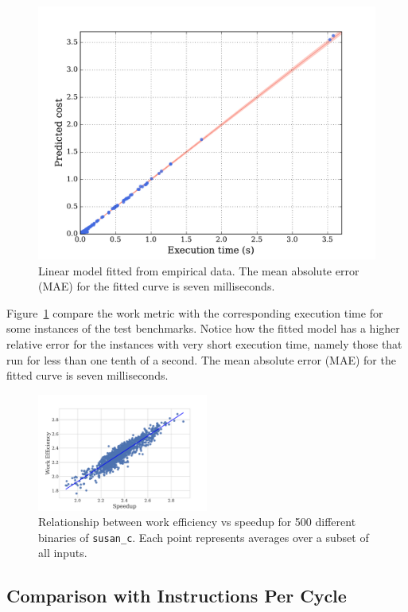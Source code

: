 \begin{figure}[t]
    \centering
    \includegraphics[width=0.6\linewidth]{figs/cost-model.pdf}
    \caption{Linear model fitted from empirical data. The mean absolute error (MAE) for the fitted curve is seven milliseconds.}
    \label{fig:cost-model}
\end{figure}

Figure~\ref{fig:cost-model} compare the work metric with the corresponding execution time for some instances of the test benchmarks.
Notice how the fitted model has a higher relative error for the instances with very short execution time, namely those that run for less than one tenth of a second.
The mean absolute error (MAE) for the fitted curve is seven milliseconds.

\begin{figure}[t]
    \centering
    \includegraphics[width=0.5\textwidth]{figs/motivation-work-efficiency.pdf}
    \caption{Relationship between work efficiency vs speedup for 500 different binaries of \texttt{susan\_c}.
            Each point represents averages over a subset of all inputs.}
    \label{fig:motivation-work-efficiency}
\end{figure}


\subsection{Comparison with Instructions Per Cycle} \label{sec:ipc-vs-work-metric}

